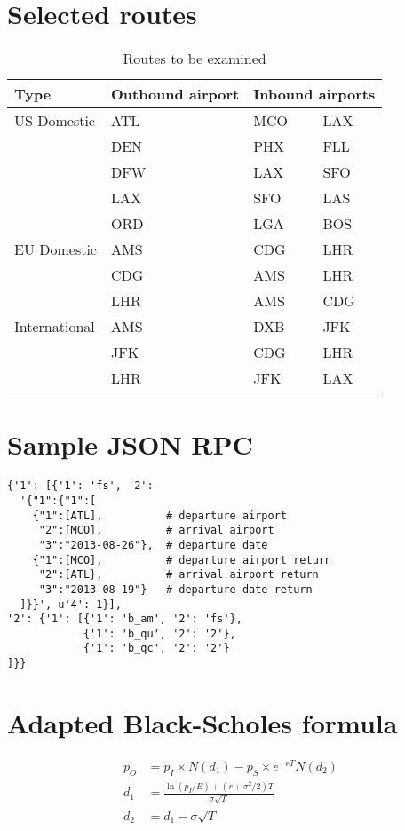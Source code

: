 \chapter{Selected routes}
\label{app:SelectedRoutes}
\begin{table}[h]
	\centering
    \begin{tabular}{ l | l | l l }
        Type        & Outbound airport & \multicolumn{2}{c}{Inbound airports}        \\ \hline \hline
        US Domestic & ATL & MCO & LAX \\
        ~           & DEN & PHX & FLL \\
        ~           & DFW & LAX & SFO \\
        ~           & LAX & SFO & LAS \\
        ~           & ORD & LGA & BOS \\
        EU Domestic & AMS & CDG & LHR \\
		~           & CDG & AMS & LHR \\
		~           & LHR & AMS & CDG \\
        International & AMS & DXB & JFK \\ 
        ~             & JFK & CDG & LHR \\
        ~             & LHR & JFK & LAX \\
    \end{tabular}
	\caption{Routes to be examined}
\end{table}

\chapter{Sample JSON RPC}
\label{app:SampleJSONRPC}
\small
\begin{verbatim}
{'1': [{'1': 'fs', '2':
  '{"1":{"1":[
    {"1":[ATL],          # departure airport
     "2":[MCO],          # arrival airport
     "3":"2013-08-26"},  # departure date
    {"1":[MCO],          # departure airport return
     "2":[ATL},          # arrival airport return
     "3":"2013-08-19"}   # departure date return
  ]}}', u'4': 1}],
'2': {'1': [{'1': 'b_am', '2': 'fs'},
            {'1': 'b_qu', '2': '2'},
            {'1': 'b_qc', '2': '2'}
]}}
\end{verbatim}

\chapter{Adapted Black-Scholes formula}
\label{app:AdaptedBlackScholesFormula}
\begin{align*}
p_O &= p_I \times N(d_1) - p_S \times e^{-rT}N(d_2) \\
d_1 &= \frac{\ln(p_I/E) + (r + \sigma^2/2)T}{\sigma \sqrt{T}} \\
d_2 &= d_1 - \sigma \sqrt{T}
\end{align*}


